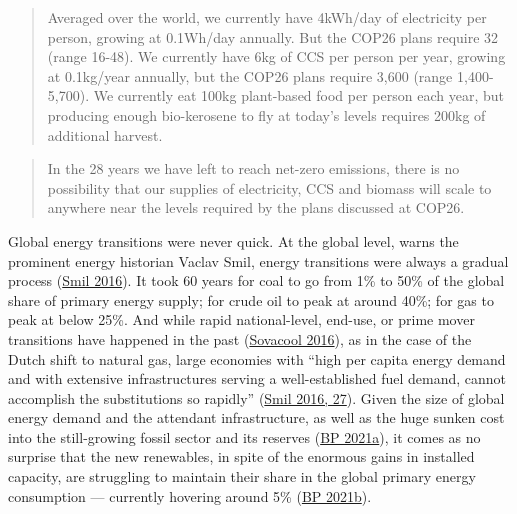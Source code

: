 \documentclass[a4paper, nobind]{templates/ociamthesis}
\begin{document}
\begin{quote}
Averaged over the world, we currently have 4kWh/day of electricity per person, growing at 0.1Wh/day annually. But the COP26 plans require 32 (range 16-48). We currently have 6kg of CCS per person per year, growing at 0.1kg/year annually, but the COP26 plans require 3,600 (range 1,400-5,700). We currently eat 100kg plant-based food per person each year, but producing enough bio-kerosene to fly at today's levels requires 200kg of additional harvest.
\end{quote}

\begin{quote}
In the 28 years we have left to reach net-zero emissions, there is no possibility that our supplies of electricity, CCS and biomass will scale to anywhere near the levels required by the plans discussed at COP26.
\end{quote}

Global energy transitions were never quick. At the global level, warns the prominent energy historian Vaclav Smil, energy transitions were always a gradual process (\protect\hyperlink{ref-smil_energy_2016}{Smil 2016}). It took 60 years for coal to go from 1\% to 50\% of the global share of primary energy supply; for crude oil to peak at around 40\%; for gas to peak at below 25\%. And while rapid national-level, end-use, or prime mover transitions have happened in the past (\protect\hyperlink{ref-sovacool_how_2016}{Sovacool 2016}), as in the case of the Dutch shift to natural gas, large economies with ``high per capita energy demand and with extensive infrastructures serving a well-established fuel demand, cannot accomplish the substitutions so rapidly'' (\protect\hyperlink{ref-smil_energy_2016}{Smil 2016, 27}). Given the size of global energy demand and the attendant infrastructure, as well as the huge sunken cost into the still-growing fossil sector and its reserves (\protect\hyperlink{ref-bp_energy_2021}{BP 2021a}), it comes as no surprise that the new renewables, in spite of the enormous gains in installed capacity, are struggling to maintain their share in the global primary energy consumption --- currently hovering around 5\% (\protect\hyperlink{ref-bp_statistical_2021}{BP 2021b}).
\end{document}
